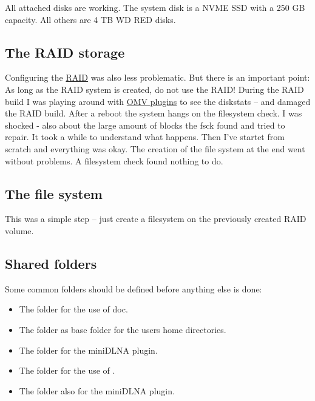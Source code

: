 All attached disks are working. The system disk is a NVME SSD with a 250 GB
capacity. All others are 4 TB WD RED disks.


\subsection{The RAID storage}

Configuring the \href{https://en.wikipedia.org/wiki/RAID}{RAID} was also less
problematic. But there is an important point: As long as the RAID system is
created, do not use the RAID! During the RAID build I was playing around with
\href{https://www.openmediavault.org/?page_id=2014}{OMV plugins} to see the
diskstats -- and damaged the RAID build. After a reboot the system hangs on
the filesystem check. I was shocked - also about the large amount of blocks
the fsck found and tried to repair. It took a while to understand what happens.
Then I've startet from scratch and everything was okay. The creation of the
file system at the end went without problems. A filesystem check found nothing
to do.


\subsection{The file system}

This was a simple step -- just create a filesystem on the previously created
RAID volume.


\subsection{Shared folders}\label{subsec:Shared folders}

Some common folders should be defined before anything else is done:

\begin{itemize}
    \item The folder  for the use of \gls{doc}.
    \item The folder  as base folder for the users home directories.
    \item The folder  for the miniDLNA plugin.
    \item The folder  for the use of .
    \item The folder  also for the miniDLNA plugin.
\end{itemize}

